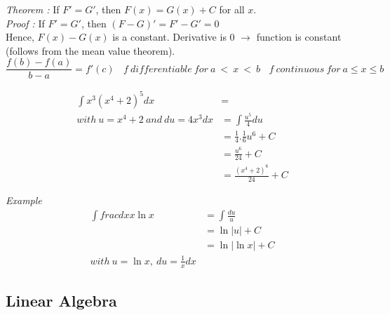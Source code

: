 \documentclass{article}
\begin{document}
            \textit{Theorem : } If $F' = G'$, then $F(x)=G(x)+C$ for all $x$.\\
            \textit{Proof :} If $F' = G'$, then $(F - G)' = F' - G' = 0$\\
            Hence, $F(x)-G(x)$ is a constant. Derivative is 0 $\rightarrow$ function is constant (follows from the mean value theorem).\\

            \[
                \label{Mean value theorem}
                \frac{f(b) - f(a)}{b-a} = f'(c)~ ~ ~ ~
                f ~differentiable ~for~ a~ < ~x ~< ~b ~ ~ ~ ~
                f ~continuous ~for~ a \leq x \leq b
            \]

            \begin{align*}
                \int x^3 (x^4 + 2)^5 dx &= \\
                with~ u = x^4 +2 ~and ~du = 4x^3 dx
                 &= \int \frac{u^5}{4}du\\
                 &= \frac{1}{4}.\frac{1}{6}u^6+C\\
                 &= \frac{u^6}{24}+C\\
                 &= \frac{(x^4 +2)^6}{24}+C
            \end{align*}

            \textit{Example}
            \begin{align*}
                \int frac{dx}{x\ln x} &= \int \frac{du}{u}\\
                &= \ln |u| + C\\
                &= \ln |\ln x| +C\\
                with~ u=\ln x, ~ du=\frac{1}{x}dx
            \end{align*}



        \subsection{Linear Algebra}
\end{document}
